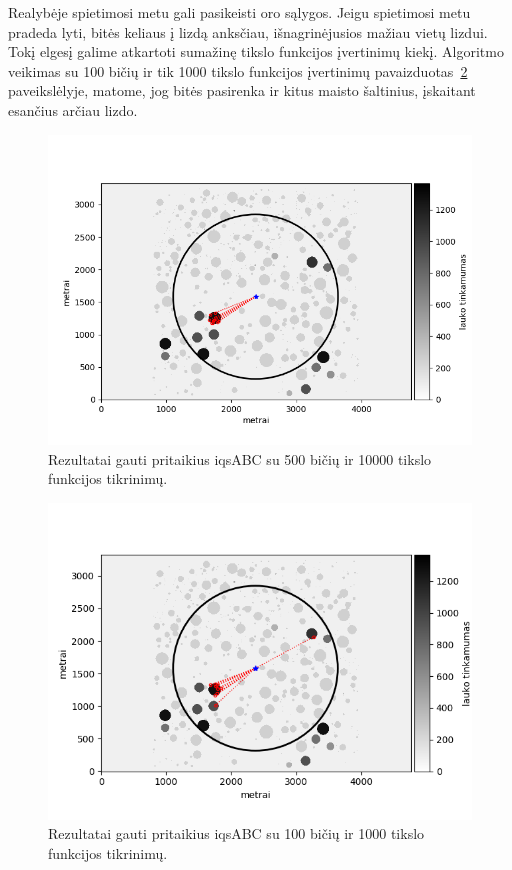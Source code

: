 \documentclass{VUMIFKompMagistrinis}
\begin{document}
Realybėje spietimosi metu gali pasikeisti oro sąlygos. Jeigu spietimosi metu pradeda lyti, bitės keliaus į lizdą anksčiau, išnagrinėjusios mažiau vietų lizdui. Tokį elgesį galime atkartoti sumažinę tikslo funkcijos įvertinimų kiekį. Algoritmo veikimas su 100 bičių ir tik 1000 tikslo funkcijos įvertinimų pavaizduotas~\ref{step2} paveikslėlyje, matome, jog bitės pasirenka ir kitus maisto šaltinius, įskaitant esančius arčiau lizdo. 

\begin{figure}
    \centering
    \includegraphics[scale=0.7]{img/new/step1.png}
    \caption{Rezultatai gauti  pritaikius iqsABC su 500 bičių ir 10000 tikslo funkcijos tikrinimų.}
    \label{step1}
\end{figure}


\begin{figure}
    \centering
    \includegraphics[scale=0.8]{img/new/step2.png}
    \caption{Rezultatai gauti  pritaikius iqsABC su 100 bičių ir 1000 tikslo funkcijos tikrinimų.}
    \label{step2}
\end{figure}
\end{document}
